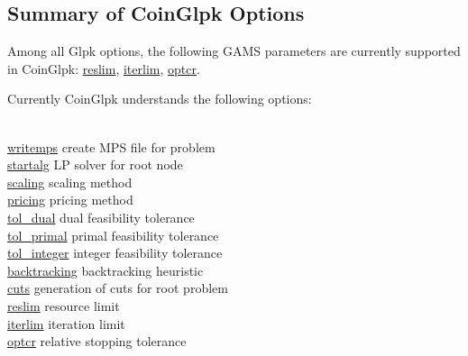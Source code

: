 \subsection{Summary of CoinGlpk Options}

Among all Glpk options, the following GAMS parameters are currently supported in CoinGlpk:
\hyperlink{glpkreslim}{reslim}, \hyperlink{glpkiterlim}{iterlim}, \hyperlink{glpkoptcr}{optcr}.

Currently CoinGlpk understands the following options:
\begin{tabbing}
\hspace {1.0in} \= \\
\hyperlink{glpkwritemps}
{writemps} \> create MPS file for problem \\
\hyperlink{glpkstartalg}
{startalg} \> LP solver for root node \\
\hyperlink{scaling}
{scaling} \> scaling method \\
\hyperlink{pricing}
{pricing} \> pricing method \\
\hyperlink{tol_dual}
{tol\_dual} \> dual feasibility tolerance \\
\hyperlink{tol_primal}
{tol\_primal} \> primal feasibility tolerance \\
\hyperlink{tol_integer}
{tol\_integer} \> integer feasibility tolerance \\
\hyperlink{backtracking}
{backtracking} \> backtracking heuristic \\
\hyperlink{glpkcuts}
{cuts} \> generation of cuts for root problem \\
\hyperlink{glpkreslim}
{reslim} \> resource limit \\
\hyperlink{glpkiterlim}
{iterlim} \> iteration limit \\
\hyperlink{glpkoptcr}
{optcr} \> relative stopping tolerance \\
\end{tabbing}


